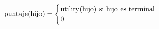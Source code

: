 \documentclass[preview]{standalone}
\begin{document}
\begin{align*}
\text{puntaje(hijo)} =  \begin{cases} \text{utility(hijo) si hijo es terminal}\cr 0 \cr \end{cases}
\end{align*}
\end{document}
